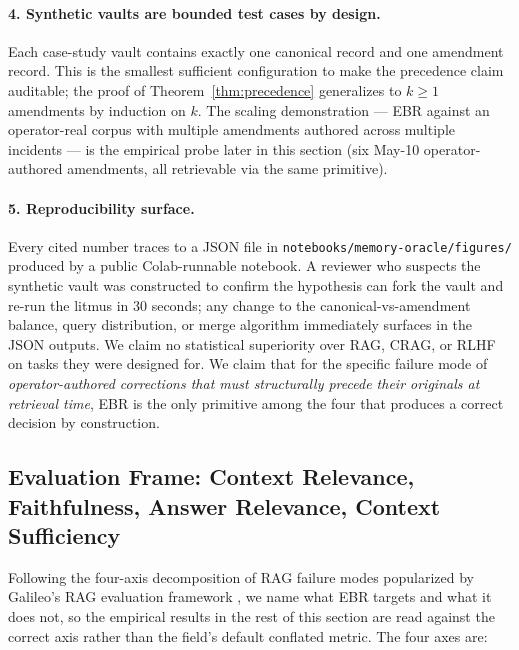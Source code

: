 \documentclass[runningheads]{llncs}
\begin{document}
\paragraph{4. Synthetic vaults are bounded test cases by design.}
Each case-study vault contains exactly one canonical record and one
amendment record. This is the smallest sufficient configuration to make
the precedence claim auditable; the proof of Theorem~\ref{thm:precedence}
generalizes to $k \geq 1$ amendments by induction on $k$. The scaling
demonstration --- EBR against an operator-real corpus with multiple
amendments authored across multiple incidents --- is the empirical
probe later in this section (six May-10 operator-authored amendments,
all retrievable via the same primitive).

\paragraph{5. Reproducibility surface.} Every cited number traces to a
JSON file in \texttt{notebooks/memory-oracle/figures/} produced by a
public Colab-runnable notebook. A reviewer who suspects the synthetic
vault was constructed to confirm the hypothesis can fork the vault and
re-run the litmus in 30 seconds; any change to the canonical-vs-amendment
balance, query distribution, or merge algorithm immediately surfaces in
the JSON outputs. We claim no statistical superiority over RAG, CRAG, or
RLHF on tasks they were designed for. We claim that for the specific
failure mode of \emph{operator-authored corrections that must structurally
precede their originals at retrieval time}, EBR is the only primitive
among the four that produces a correct decision by construction.

\subsection{Evaluation Frame: Context Relevance, Faithfulness, Answer Relevance, Context Sufficiency}
\label{sec:eval-frame}

Following the four-axis decomposition of RAG failure modes popularized by
Galileo's RAG evaluation framework \cite{galileo2024rag}, we name what
EBR targets and what it does not, so the empirical results in the rest
of this section are read against the correct axis rather than the
field's default conflated metric. The four axes are:
\end{document}
